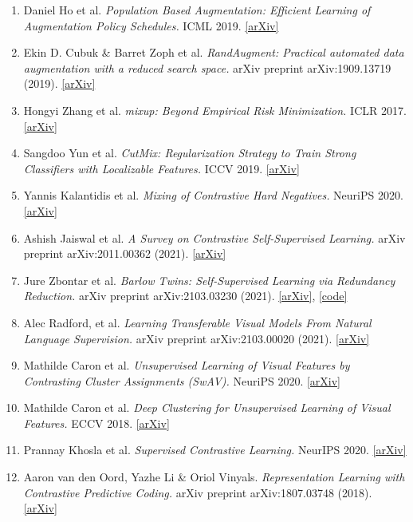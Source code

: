 \documentclass[12pt]{article}
\begin{document}
\begin{enumerate}
    \item Daniel Ho et al. \textit{Population Based Augmentation: Efficient Learning of Augmentation Policy Schedules.} ICML 2019. \href{https://arxiv.org/abs/1905.05393}{[arXiv]}
    \item Ekin D. Cubuk \& Barret Zoph et al. \textit{RandAugment: Practical automated data augmentation with a reduced search space.} arXiv preprint arXiv:1909.13719 (2019). \href{https://arxiv.org/abs/1909.13719}{[arXiv]}
    \item Hongyi Zhang et al. \textit{mixup: Beyond Empirical Risk Minimization.} ICLR 2017. \href{https://arxiv.org/abs/1710.09412}{[arXiv]}
    \item Sangdoo Yun et al. \textit{CutMix: Regularization Strategy to Train Strong Classifiers with Localizable Features.} ICCV 2019. \href{https://arxiv.org/abs/1905.04899}{[arXiv]}
    \item Yannis Kalantidis et al. \textit{Mixing of Contrastive Hard Negatives.} NeuriPS 2020. \href{https://arxiv.org/abs/2010.01028}{[arXiv]}
    \item Ashish Jaiswal et al. \textit{A Survey on Contrastive Self-Supervised Learning.} arXiv preprint arXiv:2011.00362 (2021). \href{https://arxiv.org/abs/2011.00362}{[arXiv]}
    \item Jure Zbontar et al. \textit{Barlow Twins: Self-Supervised Learning via Redundancy Reduction.} arXiv preprint arXiv:2103.03230 (2021). \href{https://arxiv.org/abs/2103.03230}{[arXiv]}, \href{https://github.com/facebookresearch/barlowtwins}{[code]}
    \item Alec Radford, et al. \textit{Learning Transferable Visual Models From Natural Language Supervision.} arXiv preprint arXiv:2103.00020 (2021). \href{https://arxiv.org/abs/2103.00020}{[arXiv]}
    \item Mathilde Caron et al. \textit{Unsupervised Learning of Visual Features by Contrasting Cluster Assignments (SwAV).} NeuriPS 2020. \href{https://arxiv.org/abs/2006.09882}{[arXiv]}
    \item Mathilde Caron et al. \textit{Deep Clustering for Unsupervised Learning of Visual Features.} ECCV 2018. \href{https://arxiv.org/abs/1807.05520}{[arXiv]}
    \item Prannay Khosla et al. \textit{Supervised Contrastive Learning.} NeurIPS 2020. \href{https://arxiv.org/abs/2004.11362}{[arXiv]}
    \item Aaron van den Oord, Yazhe Li \& Oriol Vinyals. \textit{Representation Learning with Contrastive Predictive Coding.} arXiv preprint arXiv:1807.03748 (2018). \href{https://arxiv.org/abs/1807.03748}{[arXiv]}

\end{enumerate}
\end{document}
